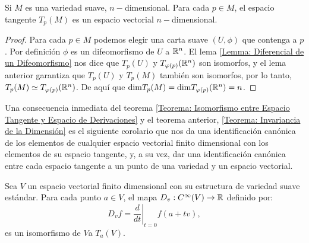 \begin{theorem}\label{Teorema: Invariancia de la Dimensión}
	Si $M$ es una variedad suave, $n-$dimensional. Para cada $p \in M$, el espacio tangente $T_p(M)$ es un espacio vectorial $n-$dimensional.
\end{theorem}

\begin{proof}
	Para cada $p \in M$ podemos elegir una carta suave $(U, \phi)$ que contenga a $p$. Por definición $\phi$ es un difeomorfismo de $U$ a $\mathbb{R}^n$. El lema \ref{Lemma: Diferencial de un Difeomorfismo} nos dice que $T_{p}(U)$ y $T_{\varphi(p)}(\mathbb{R}^n)$ son isomorfos, y el lema anterior garantiza que $T_{p}(U)$ y $T_{p}(M)$ también son isomorfos, por lo tanto, $T_{p}(M) \simeq T_{\varphi(p)}(\mathbb{R}^n)$. De aquí que $\mathrm{dim} T_p(M) = \mathrm{dim} T_{\varphi(p)}(\mathbb{R}^n) = n$.
\end{proof}

Una consecuencia inmediata del teorema \ref{Teorema: Isomorfismo entre Espacio Tangente y Espacio de Derivaciones} y el teorema anterior, \ref{Teorema: Invariancia de la Dimensión} es el siguiente corolario que nos da una identificación canónica de los elementos de cualquier espacio vectorial finito dimensional con los elementos de su espacio tangente, y, a su vez, dar una identificación canónica entre cada espacio tangente a un punto de una variedad y un espacio vectorial.

\begin{corollary}
	Sea $V$ un espacio vectorial finito dimensional con su estructura de variedad suave estándar. Para cada punto $a \in V$, el mapa $D_v: C^{\infty}(V) \to \mathbb{R}$ definido por:
	\[D_vf = \left. \frac{d}{dt} \right|_{t=0} f(a+tv), \]
	es un isomorfismo de $V$a $T_a(V)$.
\end{corollary}
